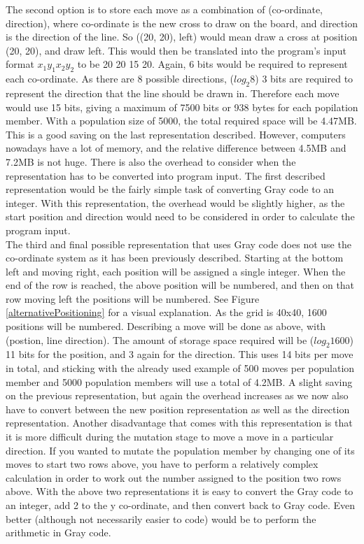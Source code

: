 \documentclass[]{report}
\begin{document}
The second option is to store each move as a combination of (co-ordinate, direction), where co-ordinate is the new cross to draw on the board, and direction is the direction of the line. So ((20, 20), left) would mean draw a cross at position (20, 20), and draw left. This would then be translated into the program's input format $x_1 y_1 x_2 y_2$ to be 20 20 15 20. Again, 6 bits would be required to represent each co-ordinate. As there are 8 possible directions, ($log_2 8$) 3 bits are required to represent the direction that the line should be drawn in. Therefore each move would use 15 bits, giving a maximum of 7500 bits or 938 bytes for each popilation member. With a population size of 5000, the total required space will be 4.47MB. This is a good saving on the last representation described. However, computers nowadays have a lot of memory, and the relative difference between 4.5MB and 7.2MB is not huge. There is also the overhead to consider when the representation has to be converted into program input. The first described representation would be the fairly simple task of converting Gray code to an integer. With this representation, the overhead would be slightly higher, as the start position and direction would need to be considered in order to calculate the program input. \\

The third and final possible representation that uses Gray code does not use the co-ordinate system as it has been previously described. Starting at the bottom left and moving right, each position will be assigned a single integer. When the end of the row is reached, the above position will be numbered, and then on that row moving left the positions will be numbered. See Figure \ref{alternativePositioning} for a visual explanation. As the grid is 40x40, 1600 positions will be numbered. Describing a move will be done as above, with (postion, line direction). The amount of storage space required will be ($log_2 1600$) 11 bits for the position, and 3 again for the direction. This uses 14 bits per move in total, and sticking with the already used example of 500 moves per population member and 5000 population members will use a total of 4.2MB. A slight saving on the previous representation, but again the overhead increases as we now also have to convert between the new position representation as well as the direction representation. Another disadvantage that comes with this representation is that it is more difficult during the mutation stage to move a move in a particular direction. If you wanted to mutate the population member by changing one of its moves to start two rows above, you have to perform a relatively complex calculation in order to work out the number assigned to the position two rows above. With the above two representations it is easy to convert the Gray code to an integer, add 2 to the y co-ordinate, and then convert back to Gray code. Even better (although not necessarily easier to code) would be to perform the arithmetic in Gray code. \\
\end{document}
